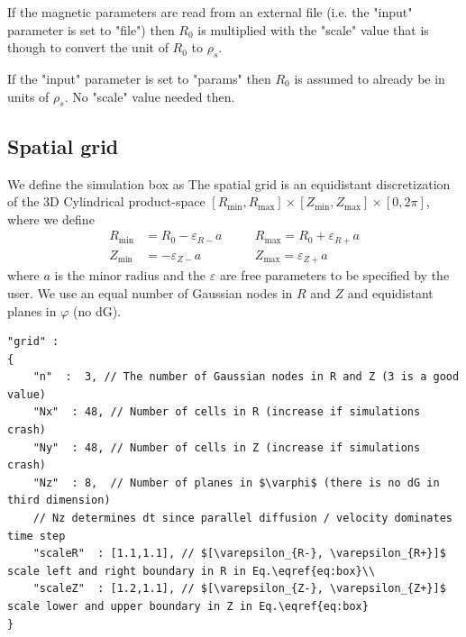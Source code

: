 \begin{tcolorbox}[title=Unit of $R_0$]
If the magnetic parameters are read from an external file (i.e. the "input"
parameter is set to "file") then $R_0$ is multiplied with the "scale" value
that is though to convert the unit of $R_0$ to $\rho_s$.

If the "input" parameter is set to "params" then $R_0$ is assumed to already be
in units of $\rho_s$. No "scale" value needed then.
\end{tcolorbox}

\subsection{Spatial grid} \label{sec:spatial}
We define the simulation box as
The spatial grid is an equidistant discretization of the 3D Cylindrical
product-space
$[ R_{\min}, R_{\max}]\times [Z_{\min}, Z_{\max}] \times [0,2\pi]$,
where we define
\begin{align} \label{eq:box}
    R_{\min}&=R_0-\varepsilon_{R-}a\quad
    &&R_{\max}=R_0+\varepsilon_{R+}a\nonumber\\
    Z_{\min}&=-\varepsilon_{Z-}a\quad
    &&Z_{\max}=\varepsilon_{Z+}a
\end{align}
where $a$ is the minor radius and
the $\varepsilon$ are free parameters to be specified by the user.
We use an equal number of Gaussian nodes in $R$ and $Z$ and equidistant
planes in $\varphi$ (no dG).
\begin{verbatim}
"grid" :
{
    "n"  :  3, // The number of Gaussian nodes in R and Z (3 is a good value)
    "Nx"  : 48, // Number of cells in R (increase if simulations crash)
    "Ny"  : 48, // Number of cells in Z (increase if simulations crash)
    "Nz"  : 8,  // Number of planes in $\varphi$ (there is no dG in third dimension)
    // Nz determines dt since parallel diffusion / velocity dominates time step
    "scaleR"  : [1.1,1.1], // $[\varepsilon_{R-}, \varepsilon_{R+}]$ scale left and right boundary in R in Eq.\eqref{eq:box}\\
    "scaleZ"  : [1.2,1.1], // $[\varepsilon_{Z-}, \varepsilon_{Z+}]$ scale lower and upper boundary in Z in Eq.\eqref{eq:box}
}
\end{verbatim}
